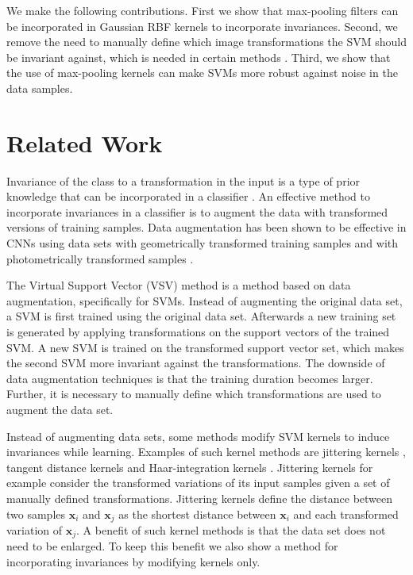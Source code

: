 \documentclass[10pt,twocolumn,letterpaper]{article}
\begin{document}
We make the following contributions.
First we show that max-pooling filters can be incorporated in Gaussian RBF kernels to incorporate invariances.
Second, we remove the need to manually define which image transformations the SVM should be invariant against, which is needed in certain methods \cite{decosteTrainingInvariantSupport2002, scholkopfIncorporatingInvariancesSupport1996}.
Third, we show that the use of max-pooling kernels can make SVMs more robust against noise in the data samples. 






\section{Related Work}

Invariance of the class to a transformation in the input is a type of prior knowledge that can be incorporated in a classifier \cite{lauerIncorporatingPriorKnowledge2008}. 
An effective method to incorporate invariances in a classifier is to augment the data with transformed versions of training samples.
Data augmentation has been shown to be effective in CNNs using data sets with geometrically transformed training samples \cite{kauderer-abramsQuantifyingTranslationInvarianceConvolutional2017} and with photometrically transformed samples \cite{taylorImprovingDeepLearning2017}. 

The Virtual Support Vector (VSV) method \cite{scholkopfIncorporatingInvariancesSupport1996} is a method based on data augmentation, specifically for SVMs. 
Instead of augmenting the original data set, a SVM is first trained using the original data set. 
Afterwards a new training set is generated by applying transformations on the support vectors of the trained SVM. 
A new SVM is trained on the transformed support vector set, which makes the second SVM more invariant against the transformations. 
The downside of data augmentation techniques is that the training duration becomes larger. 
Further, it is necessary to manually define which transformations are used to augment the data set.

Instead of augmenting data sets, some methods modify SVM kernels to induce invariances while learning. 
Examples of such kernel methods are jittering kernels \cite{decosteTrainingInvariantSupport2002}, tangent distance kernels \cite{haasdonkTangentDistanceKernels2002} and Haar-integration kernels \cite{haasdonkInvarianceKernelMethods2005}. 
Jittering kernels for example consider the transformed variations of its input samples given a set of manually defined transformations. 
Jittering kernels define the distance between two samples $\textbf{x}_i$ and $\textbf{x}_j$ as the shortest distance between $\textbf{x}_i$ and each transformed variation of $\textbf{x}_j$. 
A benefit of such kernel methods is that the data set does not need to be enlarged.
To keep this benefit we also show a method for incorporating invariances by modifying kernels only.  
\end{document}

